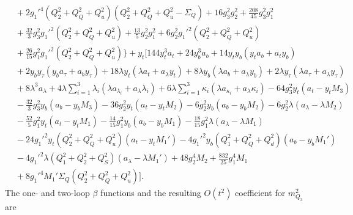 \documentclass[preprint,amsmath,amssymb,aps,superscriptaddress,prd,
showpacs,floatfix,nofootinbib]{revtex4-1}
\begin{document}
\begin{subequations}
\begin{align}
& {} + 2 g_1'^4 \left ( Q_2^2 + Q_Q^2 + Q_u^2 \right ) \left ( Q_2^2 + Q_Q^2
+ Q_u^2 - \Sigma_{Q} \right ) + 16 g_3^2 g_2^2 + \frac{208}{45} g_3^2 g_1^2
\nonumber \\
& {} + \frac{32}{3} g_3^2 g_1'^2 \left ( Q_2^2 + Q_Q^2 + Q_u^2 \right ) +
\frac{13}{5} g_2^2 g_1^2 + 6 g_2^2 g_1'^2 \left ( Q_2^2 + Q_Q^2 + Q_u^2
\right ) \nonumber \\
& {} + \frac{26}{15} g_1^2 g_1'^2 \left ( Q_2^2 + Q_Q^2 + Q_u^2 \right )
\bigg \} + y_t \bigg [ 144 y_t^3 a_t + 24 y_b^3 a_b + 14 y_t y_b \left (
y_t a_b + a_t y_b \right ) \nonumber \\
& {} + 2 y_b y_\tau \left ( y_b a_\tau + a_b y_\tau \right ) +
18 \lambda y_t \left ( \lambda a_t + a_{\lambda} y_t \right ) +
8 \lambda y_b \left ( \lambda a_b + a_{\lambda} y_b \right ) +
2 \lambda y_\tau \left ( \lambda a_\tau + a_{\lambda} y_\tau \right )
\nonumber \\
& {} + 8 \lambda^3 a_{\lambda} + 4 \lambda \sum_{i=1}^3 \lambda_i \left (
\lambda a_{\lambda_i} + a_{\lambda} \lambda_i \right ) +
6 \lambda \sum_{i=1}^3 \kappa_i \left ( \lambda a_{\kappa_i} +
a_{\lambda} \kappa_i \right ) - 64 g_3^2 y_t \left ( a_t - y_t M_3 \right )
\nonumber \\
& {} - \frac{32}{3} g_3^2 y_b \left ( a_b - y_b M_3 \right ) -
36 g_2^2 y_t \left ( a_t - y_t M_2 \right ) - 6 g_2^2 y_b \left ( a_b -
y_b M_2 \right ) - 6 g_2^2 \lambda \left ( a_\lambda - \lambda M_2 \right )
\nonumber \\
& {} - \frac{52}{5} g_1^2 y_t \left ( a_t - y_t M_1 \right ) -
\frac{14}{15} g_1^2 y_b \left ( a_b - y_b M_1 \right ) -
\frac{18}{15} g_1^2 \lambda \left ( a_\lambda - \lambda M_1 \right )
\nonumber \\
& {} - 24 g_1'^2 y_t \left ( Q_2^2 + Q_Q^2 + Q_u^2 \right ) \left ( a_t -
y_t M_1' \right ) - 4 g_1'^2 y_b \left ( Q_1^2 + Q_Q^2 + Q_d^2 \right )
\left ( a_b - y_b M_1' \right ) \nonumber \\
& {} - 4 g_1'^2 \lambda \left ( Q_1^2 + Q_2^2 + Q_S^2 \right )
\left ( a_\lambda - \lambda M_1' \right ) + 48 g_2^4 M_2 +
\frac{832}{25} g_1^4 M_1 \nonumber \\
& {} + 8 g_1'^4 M_1' \Sigma_Q \left ( Q_2^2 + Q_Q^2 + Q_u^2 \right ) \bigg ] .
\label{eq:USSMTYu22Ot2Coeff}
\end{align}
\end{subequations}
The one- and two-loop $\beta$ functions and the resulting $O(t^2)$ coefficient
for $m_{Q_3}^2$ are
\end{document}
